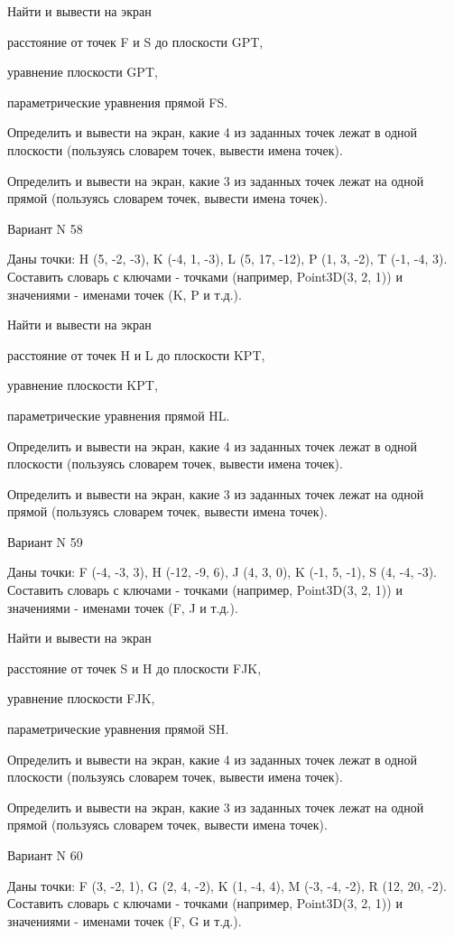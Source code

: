 \documentclass[11pt]{report}
\begin{document}
Найти и вывести на экран


расстояние от точек F и S до плоскости GPT,


уравнение плоскости GPT,


параметрические уравнения прямой FS.


Определить и вывести на экран, какие 4 из заданных точек лежат в одной плоскости (пользуясь словарем точек, вывести имена точек).


Определить и вывести на экран, какие 3 из заданных точек лежат на одной прямой (пользуясь словарем точек, вывести имена точек).

\newpage
Вариант N 58

Даны точки: H (5, -2, -3), K (-4, 1, -3), L (5, 17, -12), P (1, 3, -2), T (-1, -4, 3).
Составить словарь с ключами - точками (например, Point3D(3, 2, 1)) и значениями - именами точек (K, P и т.д.).


Найти и вывести на экран


расстояние от точек H и L до плоскости KPT,


уравнение плоскости KPT,


параметрические уравнения прямой HL.


Определить и вывести на экран, какие 4 из заданных точек лежат в одной плоскости (пользуясь словарем точек, вывести имена точек).


Определить и вывести на экран, какие 3 из заданных точек лежат на одной прямой (пользуясь словарем точек, вывести имена точек).

\newpage
Вариант N 59

Даны точки: F (-4, -3, 3), H (-12, -9, 6), J (4, 3, 0), K (-1, 5, -1), S (4, -4, -3).
Составить словарь с ключами - точками (например, Point3D(3, 2, 1)) и значениями - именами точек (F, J и т.д.).


Найти и вывести на экран


расстояние от точек S и H до плоскости FJK,


уравнение плоскости FJK,


параметрические уравнения прямой SH.


Определить и вывести на экран, какие 4 из заданных точек лежат в одной плоскости (пользуясь словарем точек, вывести имена точек).


Определить и вывести на экран, какие 3 из заданных точек лежат на одной прямой (пользуясь словарем точек, вывести имена точек).

\newpage
Вариант N 60

Даны точки: F (3, -2, 1), G (2, 4, -2), K (1, -4, 4), M (-3, -4, -2), R (12, 20, -2).
Составить словарь с ключами - точками (например, Point3D(3, 2, 1)) и значениями - именами точек (F, G и т.д.).
\end{document}
